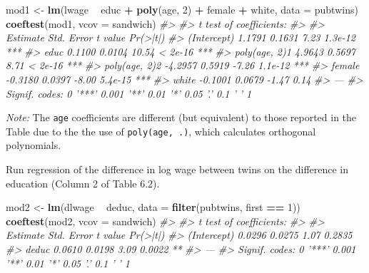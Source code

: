 \documentclass[]{book}
\newenvironment{Shaded}{\begin{snugshade}}{\end{snugshade}}
\newcommand{\CommentTok}[1]{\textcolor[rgb]{0.56,0.35,0.01}{\textit{#1}}}
\newcommand{\DataTypeTok}[1]{\textcolor[rgb]{0.13,0.29,0.53}{#1}}
\newcommand{\DecValTok}[1]{\textcolor[rgb]{0.00,0.00,0.81}{#1}}
\newcommand{\KeywordTok}[1]{\textcolor[rgb]{0.13,0.29,0.53}{\textbf{#1}}}
\newcommand{\NormalTok}[1]{#1}
\newcommand{\OperatorTok}[1]{\textcolor[rgb]{0.81,0.36,0.00}{\textbf{#1}}}
\newcommand{\StringTok}[1]{\textcolor[rgb]{0.31,0.60,0.02}{#1}}
\theoremstyle{definition}
\theoremstyle{definition}
\theoremstyle{definition}
\theoremstyle{remark}
\begin{document}
\begin{Shaded}
\begin{Highlighting}[]
\NormalTok{mod1 <-}\StringTok{ }\KeywordTok{lm}\NormalTok{(lwage }\OperatorTok{~}\StringTok{ }\NormalTok{educ }\OperatorTok{+}\StringTok{ }\KeywordTok{poly}\NormalTok{(age, }\DecValTok{2}\NormalTok{) }\OperatorTok{+}\StringTok{ }\NormalTok{female }\OperatorTok{+}\StringTok{ }\NormalTok{white, }\DataTypeTok{data =}\NormalTok{ pubtwins)}
\KeywordTok{coeftest}\NormalTok{(mod1, }\DataTypeTok{vcov =}\NormalTok{ sandwich)}
\CommentTok{#> }
\CommentTok{#> t test of coefficients:}
\CommentTok{#> }
\CommentTok{#>               Estimate Std. Error t value Pr(>|t|)    }
\CommentTok{#> (Intercept)     1.1791     0.1631    7.23  1.3e-12 ***}
\CommentTok{#> educ            0.1100     0.0104   10.54  < 2e-16 ***}
\CommentTok{#> poly(age, 2)1   4.9643     0.5697    8.71  < 2e-16 ***}
\CommentTok{#> poly(age, 2)2  -4.2957     0.5919   -7.26  1.1e-12 ***}
\CommentTok{#> female         -0.3180     0.0397   -8.00  5.4e-15 ***}
\CommentTok{#> white          -0.1001     0.0679   -1.47     0.14    }
\CommentTok{#> ---}
\CommentTok{#> Signif. codes:  0 '***' 0.001 '**' 0.01 '*' 0.05 '.' 0.1 ' ' 1}
\end{Highlighting}
\end{Shaded}

\emph{Note:} The \texttt{age} coefficients are different (but
equivalent) to those reported in the Table due to the the use of
\texttt{poly(age,\ .)}, which calculates orthogonal polynomials.

Run regression of the difference in log wage between twins on the
difference in education (Column 2 of Table 6.2).

\begin{Shaded}
\begin{Highlighting}[]
\NormalTok{mod2 <-}\StringTok{ }\KeywordTok{lm}\NormalTok{(dlwage }\OperatorTok{~}\StringTok{ }\NormalTok{deduc, }\DataTypeTok{data =} \KeywordTok{filter}\NormalTok{(pubtwins, first }\OperatorTok{==}\StringTok{ }\DecValTok{1}\NormalTok{))}
\KeywordTok{coeftest}\NormalTok{(mod2, }\DataTypeTok{vcov =}\NormalTok{ sandwich)}
\CommentTok{#> }
\CommentTok{#> t test of coefficients:}
\CommentTok{#> }
\CommentTok{#>             Estimate Std. Error t value Pr(>|t|)   }
\CommentTok{#> (Intercept)   0.0296     0.0275    1.07   0.2835   }
\CommentTok{#> deduc         0.0610     0.0198    3.09   0.0022 **}
\CommentTok{#> ---}
\CommentTok{#> Signif. codes:  0 '***' 0.001 '**' 0.01 '*' 0.05 '.' 0.1 ' ' 1}
\end{Highlighting}
\end{Shaded}
\end{document}
